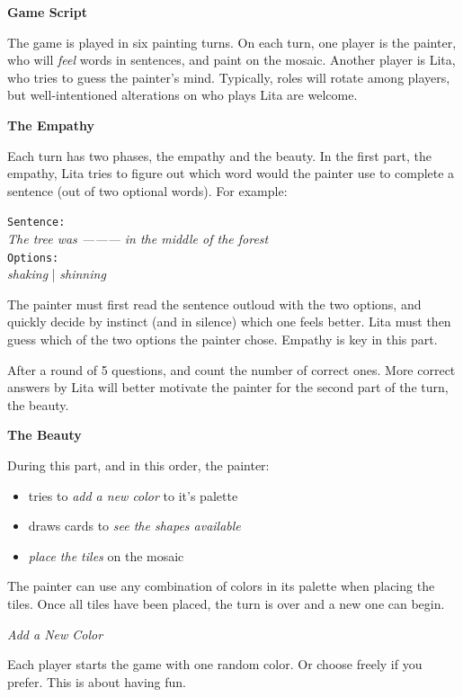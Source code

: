 \documentclass[twocolumn]{article}
\newcommand{\lvl}[1]{\vspace{0.5cm}\Large{\textbf{#1}}\vspace{0.2cm}}
\newcommand{\sublvl}[1]{\vspace{0.3cm}\large{\textit{#1}}\vspace{0.1cm}}
\begin{document}
\lvl{Game Script}

The game is played in six painting turns. On each turn, one player is the painter, who will \textit{feel} words in sentences, and paint on the mosaic. Another player is Lita, who tries to guess the painter's mind. Typically, roles will rotate among players, but well-intentioned alterations on who plays Lita are welcome. 

\lvl{The Empathy}

Each turn has two phases, the empathy and the beauty. In the first part, the empathy, Lita tries to figure out which word would the painter use to complete a sentence (out of two optional words). For example:

\begin{centering}
\texttt{Sentence:}\\
\textit{The tree was --------- in the middle of the forest}\\
\texttt{Options:}\\
\textit{shaking} | \textit{shinning}\\
\end{centering}
\vspace{0.5cm}

The painter must first read the sentence outloud with the two options, and quickly decide by instinct (and in silence) which one feels better. Lita must then guess which of the two options the painter chose. Empathy is key in this part.

After a round of 5 questions, and count the number of correct ones. More correct answers by Lita will better motivate the painter for the second part of the turn, the beauty. 


\lvl{The Beauty}

During this part, and in this order, the painter:
\begin{itemize}
 \item tries to \textit{add a new color} to it's palette
 \item draws cards to \textit{see the shapes available}
 \item \textit{place the tiles} on the mosaic
\end{itemize}

The painter can use any combination of colors in its palette when placing the tiles. Once all tiles have been placed, the turn is over and a new one can begin.

\sublvl{Add a New Color}

Each player starts the game with one random color. Or choose freely if you prefer. This is about having fun.
\end{document}
